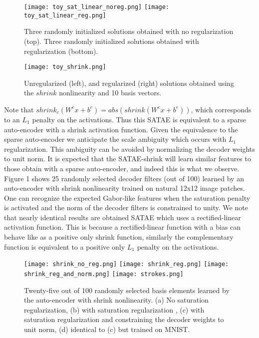 \documentclass{article} %
\begin{document}
\begin{figure}
\centering 
\texttt{[image: toy\_sat\_linear\_noreg.png]}
\texttt{[image: toy\_sat\_linear\_reg.png]}
\caption{Three randomly initialized solutions obtained with no regularization (top). Three randomly initialized solutions obtained with regularization (bottom).}  
\end{figure} 

\begin{figure}
\centering 
\texttt{[image: toy\_shrink.png]}
\caption{Unregularized (left), and regularized (right) solutions obtained using the $shrink$ nonlinearity and 10 basis vectors.}  
\end{figure} 

\noindent
Note that $shrink_c(W^e x + b^e) =  abs(shrink(W^e x + b^e))$, which corresponds to an $L_1$ penalty on the activations. Thus this SATAE is equivalent to a sparse auto-encoder with a shrink activation function. Given the equivalence to the sparse auto-encoder we anticipate the scale ambiguity which occurs with $L_1$ regularization. This ambiguity can be avoided by normalizing the decoder weights to unit norm. It is expected that the SATAE-shrink will learn similar features to those obtain with a sparse auto-encoder, and indeed this is what we observe. Figure 1 shows 25 randomly selected decoder filters (out of 100) learned by an auto-encoder with shrink nonlinearity trained on natural 12x12 image patches. One can recognize the expected Gabor-like features when the saturation penalty is activated and the norm of the decoder filters is constrained to unity. We note that nearly identical results are obtained SATAE which uses a rectified-linear activation function. This is because a rectified-linear function with a bias can behave like as a positive only shrink function, similarly the complementary function is equivalent to a positive only $L_1$ penalty on the activations.          

\begin{figure}
\centering 
\texttt{[image: shrink\_no\_reg.png]}
\texttt{[image: shrink\_reg.png]}
\texttt{[image: shrink\_reg\_and\_norm.png]}
\texttt{[image: strokes.png]}
\caption{Twenty-five out of 100 randomly selected basis elements learned by the auto-encoder with shrink nonlinearity.  (a) No saturation regularization, (b) with saturation regularization , (c) with saturation regularization and constraining the decoder weights to unit norm, (d) identical to (c) but trained on MNIST.}
\end{figure} 
\end{document}
